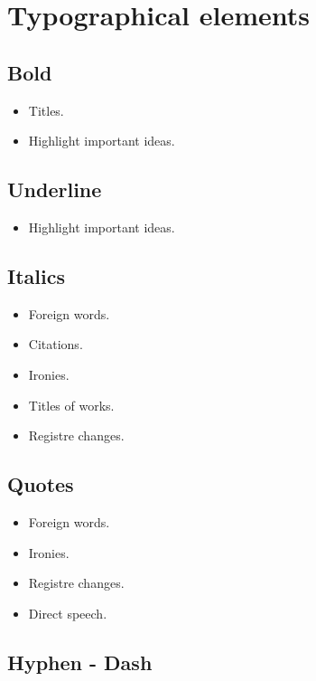 \documentclass{article}
\begin{document}
\section*{Typographical elements}

\subsection*{Bold}

\begin{itemize}
    \item Titles.
    \item Highlight important ideas.
\end{itemize}

\subsection*{Underline}

\begin{itemize}
    \item Highlight important ideas.
\end{itemize}

\subsection*{Italics}

\begin{itemize}
    \item Foreign words.
    \item Citations.
    \item Ironies.
    \item Titles of works.
    \item Registre changes.
\end{itemize}

\subsection*{Quotes}

\begin{itemize}
    \item Foreign words.
    \item Ironies.
    \item Registre changes.
    \item Direct speech.
\end{itemize}

\subsection*{Hyphen - Dash}
\end{document}
